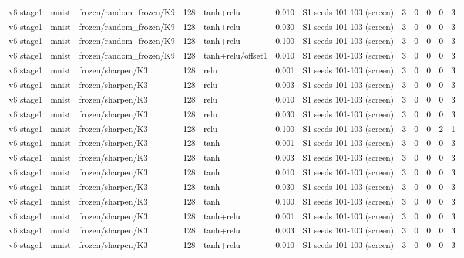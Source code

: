 \begin{table}[htbp]
{\begin{tabular}{@{}lllrlrlrrrrr@{}}
v6 stage1 & mnist & frozen/random\_frozen/K9 & 128 & tanh+relu & 0.010 & S1 seeds 101-103 (screen) & 3 & 0 & 0 & 0 & 3 \\
v6 stage1 & mnist & frozen/random\_frozen/K9 & 128 & tanh+relu & 0.030 & S1 seeds 101-103 (screen) & 3 & 0 & 0 & 0 & 3 \\
v6 stage1 & mnist & frozen/random\_frozen/K9 & 128 & tanh+relu & 0.100 & S1 seeds 101-103 (screen) & 3 & 0 & 0 & 0 & 3 \\
v6 stage1 & mnist & frozen/random\_frozen/K9 & 128 & tanh+relu/offset1 & 0.010 & S1 seeds 101-103 (screen) & 3 & 0 & 0 & 0 & 3 \\
v6 stage1 & mnist & frozen/sharpen/K3 & 128 & relu & 0.001 & S1 seeds 101-103 (screen) & 3 & 0 & 0 & 0 & 3 \\
v6 stage1 & mnist & frozen/sharpen/K3 & 128 & relu & 0.003 & S1 seeds 101-103 (screen) & 3 & 0 & 0 & 0 & 3 \\
v6 stage1 & mnist & frozen/sharpen/K3 & 128 & relu & 0.010 & S1 seeds 101-103 (screen) & 3 & 0 & 0 & 0 & 3 \\
v6 stage1 & mnist & frozen/sharpen/K3 & 128 & relu & 0.030 & S1 seeds 101-103 (screen) & 3 & 0 & 0 & 0 & 3 \\
v6 stage1 & mnist & frozen/sharpen/K3 & 128 & relu & 0.100 & S1 seeds 101-103 (screen) & 3 & 0 & 0 & 2 & 1 \\
v6 stage1 & mnist & frozen/sharpen/K3 & 128 & tanh & 0.001 & S1 seeds 101-103 (screen) & 3 & 0 & 0 & 0 & 3 \\
v6 stage1 & mnist & frozen/sharpen/K3 & 128 & tanh & 0.003 & S1 seeds 101-103 (screen) & 3 & 0 & 0 & 0 & 3 \\
v6 stage1 & mnist & frozen/sharpen/K3 & 128 & tanh & 0.010 & S1 seeds 101-103 (screen) & 3 & 0 & 0 & 0 & 3 \\
v6 stage1 & mnist & frozen/sharpen/K3 & 128 & tanh & 0.030 & S1 seeds 101-103 (screen) & 3 & 0 & 0 & 0 & 3 \\
v6 stage1 & mnist & frozen/sharpen/K3 & 128 & tanh & 0.100 & S1 seeds 101-103 (screen) & 3 & 0 & 0 & 0 & 3 \\
v6 stage1 & mnist & frozen/sharpen/K3 & 128 & tanh+relu & 0.001 & S1 seeds 101-103 (screen) & 3 & 0 & 0 & 0 & 3 \\
v6 stage1 & mnist & frozen/sharpen/K3 & 128 & tanh+relu & 0.003 & S1 seeds 101-103 (screen) & 3 & 0 & 0 & 0 & 3 \\
v6 stage1 & mnist & frozen/sharpen/K3 & 128 & tanh+relu & 0.010 & S1 seeds 101-103 (screen) & 3 & 0 & 0 & 0 & 3 \\

\end{tabular}}
\end{table}
